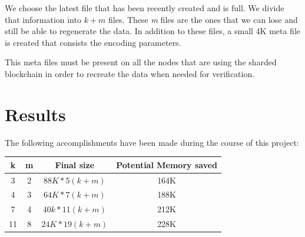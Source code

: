 \documentclass[conference]{IEEEtran}
\begin{document}
We choose the latest file that has been recently created and is full. We divide that
information into $k+ m$ files. These \textit{m} files are the ones that we can 
lose and still be able to regenerate the data. In addition to these files, a small 4K
meta file is created that consists the encoding parameters.

This meta files must be present on all the nodes that are using the sharded blockchain
in order to recreate the data when needed for verification.


\section{Results}
The following accomplishments have been made during the course of this project:



\begin{tabular}{|c||c||c||c|}
    \hline
         \textbf{k} & \textbf{m} & \textbf{Final size} &\textbf{Potential Memory saved}\\
        \hline
        3 & 2 &  $88K * 5 (k + m)$ & 164K \\
        4 & 3 &  $ 64K * 7 (k + m)$ & 188K  \\
        7 & 4 &  $40k * 11 (k + m) $ & 212K  \\
        11 & 8 & $24K * 19 (k + m) $ & 228K \\
        \hline

\end{tabular}

\vspace{1cm}
\end{document}
